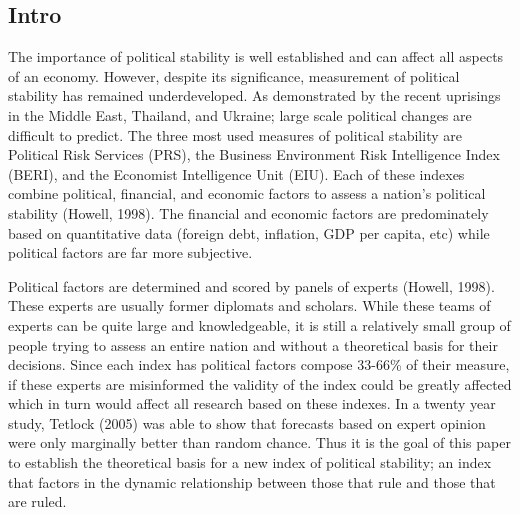 \documentclass[12pt]{article}
\begin{document}
\begin{spacing}{1.5}




\section{Intro}
The importance of political stability is well established and can affect all aspects of an economy. However, despite its significance, measurement of political stability has remained underdeveloped. As demonstrated by the recent uprisings in the Middle East, Thailand, and Ukraine; large scale political changes are difficult to predict. The three most used measures of political stability are Political Risk Services (PRS), the Business Environment Risk Intelligence Index (BERI), and the Economist Intelligence Unit (EIU). Each of these indexes combine political, financial, and economic factors to assess a nation's political stability (Howell, 1998). The financial and economic factors are predominately based on quantitative data (foreign debt, inflation, GDP per capita, etc) while political factors are far more subjective. 

Political factors are determined and scored by panels of experts (Howell, 1998). These experts are usually former diplomats and scholars. While these teams of experts can be quite large and knowledgeable, it is still a relatively small group of people trying to assess an entire nation and without a theoretical basis for their decisions. Since each index has political factors compose 33-66\% of their measure, if these experts are misinformed the validity of the index could be greatly affected which in turn would affect all research based on these indexes. In a twenty year study, Tetlock (2005) was able to show that forecasts based on expert opinion were only marginally better than random chance. Thus it is the goal of this paper to establish the theoretical basis for a new index of political stability; an index that factors in the dynamic relationship between those that rule and those that are ruled.  


\end{spacing}
\end{document}
